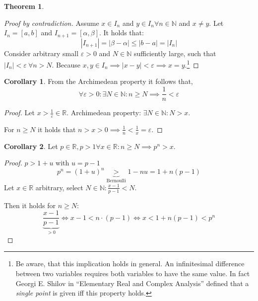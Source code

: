 \documentclass[a4paper,landscape,twocolumn]{article}
\theoremstyle{definition}
\newtheorem{theorem}{Theorem}
\newtheorem{cor}{Corollary}
\newcommand\abs[1]{\left|#1\right|}
\begin{document}
\begin{theorem}
\begin{description}
      \begin{proof}[Proof by contradiction]
        Assume $x \in I_n$ and $y \in I_n \forall n \in \mathbb N$ and $x \neq y$.
        Let $I_n = [a,b]$ and $I_{n+1} = [\alpha, \beta]$. It holds that:
        \[ \abs{I_{n+1}} = \abs{\beta - \alpha} \leq \abs{b - a} = \abs{I_n} \]
        Consider arbitrary small $\varepsilon > 0$ and $N \in \mathbb N$ sufficiently large,
        such that $\abs{I_n} < \varepsilon \:\forall n > N$. Because $x,y \in I_n \implies
        \abs{x - y} < \varepsilon \implies x = y$.\footnote{
          Be aware, that this implication holds in general.
          An infinitesimal difference between two variables requires both variables
          to have the same value. In fact Georgi E. Shilov in \enquote{Elementary Real and Complex Analysis}
          defined that a \emph{single point} is given iff this property holds.
        }%
      \end{proof}
  \end{description}
\end{theorem}

\begin{cor}
  From the Archimedean property it follows that,
  \[ \forall \varepsilon > 0: \exists N \in \mathbb N: n \geq N \implies \frac1n < \varepsilon \]
\end{cor}

\begin{proof}
  Let $x > \frac1\varepsilon \in \mathbb R$.
  Archimedean property: $\exists N \in \mathbb N: N > x$.

  For $n \geq N$ it holds that $n > x > 0 \implies \frac1n < \frac1x = \varepsilon$.
\end{proof}

\begin{cor}
  Let $p \in \mathbb R, p > 1 \forall x \in \mathbb R: n \geq N \implies p^n > x$.
\end{cor}

\begin{proof}
  $p > 1 + u$ with $u = p - 1$
  \[ p^n = (1 + u)^n \underbrace{>}_{\text{Bernoulli}} 1 - nu = 1 + n(p-1) \]
  Let $x \in \mathbb R$ arbitrary, select $N \in \mathbb N: \frac{x-1}{p-1} < N$.

  Then it holds for $n \geq N:$
  \[
    \frac{x-1}{\underbrace{p-1}_{>0}}
    \iff x - 1 < n\cdot(p-1)
    \iff x < 1 + n(p-1) < p^n
  \]
\end{proof}
\end{document}
